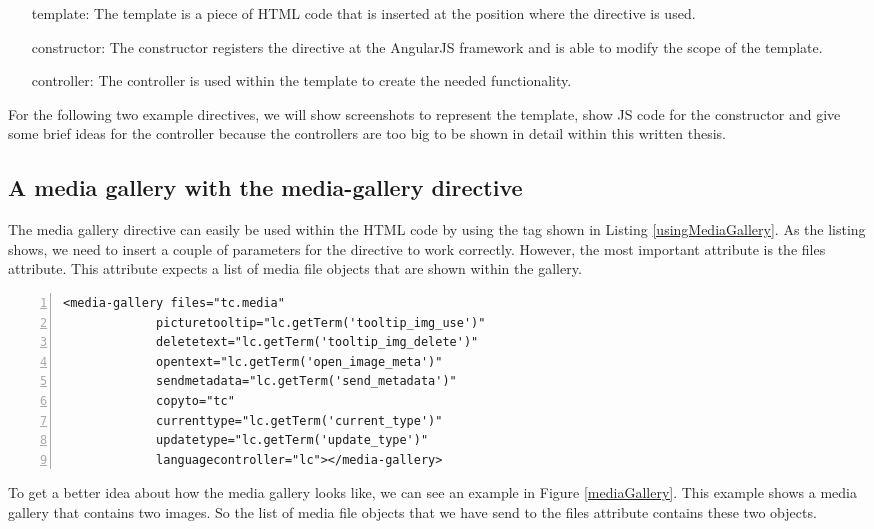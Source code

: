 \begin{itemize}
	\item[template:] The template is a piece of \ac{HTML} code that is inserted at the position where the directive is used. 
	\item[constructor:] The constructor registers the directive at the AngularJS framework and is able to modify the scope of the template.
	\item[controller:] The controller is used within the template to create the needed functionality.
\end{itemize}

For the following two example directives, we will show screenshots to represent the template, show \ac{JS} code for the constructor and give some brief ideas for the controller because the controllers are too big to be shown in detail within this written thesis.

\subsection{A media gallery with the media-gallery directive}
The media gallery directive can easily be used within the \ac{HTML} code by using the tag shown in Listing \ref{usingMediaGallery}. As the listing shows, we need to insert a couple of parameters for the directive to work correctly. However, the most important attribute is the files attribute. This attribute expects a list of media file objects that are shown within the gallery.

\begin{lstlisting}[numbers=left,caption={The listing shows the usage of the media gallery directive},label=usingMediaGallery,frame=tlbr,breaklines]
<media-gallery files="tc.media"
             picturetooltip="lc.getTerm('tooltip_img_use')"
             deletetext="lc.getTerm('tooltip_img_delete')"
             opentext="lc.getTerm('open_image_meta')"
             sendmetadata="lc.getTerm('send_metadata')"
             copyto="tc"
             currenttype="lc.getTerm('current_type')"
             updatetype="lc.getTerm('update_type')"
             languagecontroller="lc"></media-gallery>
\end{lstlisting}

To get a better idea about how the media gallery looks like, we can see an example in Figure \ref{mediaGallery}. This example shows a media gallery that contains two images. So the list of media file objects that we have send to the files attribute contains these two objects. 

